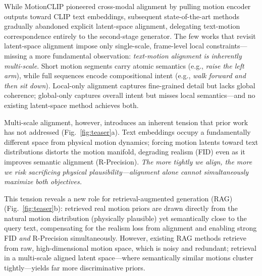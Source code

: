 \documentclass{article}
\begin{document}
While MotionCLIP \citep{tevet2022motionclip} pioneered cross-modal alignment by pulling motion encoder outputs toward CLIP text embeddings, subsequent state-of-the-art methods \citep{tevet2022human,chen2023executing,zhang2023generating,xiao2025motionstreamer} gradually abandoned explicit latent-space alignment, delegating text-motion correspondence entirely to the second-stage generator.
The few works that revisit latent-space alignment \citep{maldonado2025moclip, he2025molingo} impose only single-scale, frame-level local constraints---missing a more fundamental observation: \emph{text-motion alignment is inherently multi-scale}.
Short motion segments carry atomic semantics (e.g., \textit{raise the left arm}), while full sequences encode compositional intent (e.g., \textit{walk forward and then sit down}).
Local-only alignment captures fine-grained detail but lacks global coherence; global-only captures overall intent but misses local semantics---and no existing latent-space method achieves both.

Multi-scale alignment, however, introduces an inherent tension that prior work has not addressed (Fig.~\ref{fig:teaser}a).
Text embeddings occupy a fundamentally different space from physical motion dynamics; forcing motion latents toward text distributions distorts the motion manifold, degrading realism (FID) even as it improves semantic alignment (R-Precision).
\emph{The more tightly we align, the more we risk sacrificing physical plausibility---alignment alone cannot simultaneously maximize both objectives.}

This tension reveals a new role for retrieval-augmented generation (RAG) \citep{lewis2020retrieval} (Fig.~\ref{fig:teaser}b): retrieved real motion priors are drawn directly from the natural motion distribution (physically plausible) yet semantically close to the query text, compensating for the realism loss from alignment and enabling strong FID \emph{and} R-Precision simultaneously.
However, existing RAG methods \citep{zhang2023remodiffuse,kalakonda2025morag} retrieve from raw, high-dimensional motion space, which is noisy and redundant; retrieval in a multi-scale aligned latent space---where semantically similar motions cluster tightly---yields far more discriminative priors.
\end{document}
